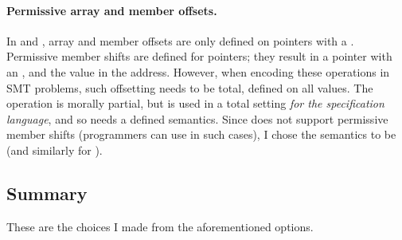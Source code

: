
\paragraph{Permissive array and member offsets.}%
In  and , array and member offsets are only defined on
pointers with a . Permissive member shifts are defined for
 pointers; they result in a pointer with an 
, and the  value in the address. However, when
encoding these operations in SMT problems, such offsetting needs to be total,
defined on all values. The operation is morally partial, but is used in a total
setting \emph{for the specification language}, and so needs a defined
semantics. Since  does not support permissive member shifts (programmers
can use  in such cases), I chose the semantics to be
 (and similarly %
for ).

\subsection{Summary}

These are the choices I made from the aforementioned options.

